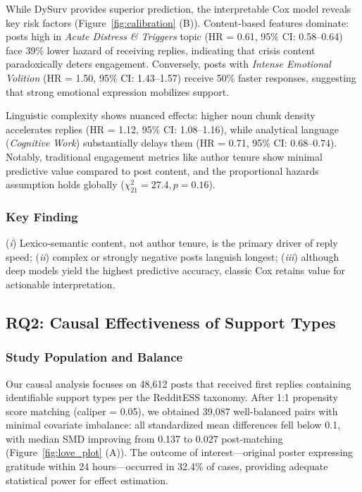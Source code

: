 \documentclass[letterpaper]{article} %
\begin{document}
While DySurv provides superior prediction, the interpretable Cox model reveals key risk factors (Figure~\ref{fig:calibration} (B)). Content-based features dominate: posts high in \emph{Acute Distress \& Triggers} topic (HR = 0.61, 95\% CI: 0.58–0.64) face 39\% lower hazard of receiving replies, indicating that crisis content paradoxically deters engagement. Conversely, posts with \emph{Intense Emotional Volition} (HR = 1.50, 95\% CI: 1.43–1.57) receive 50\% faster responses, suggesting that strong emotional expression mobilizes support.

Linguistic complexity shows nuanced effects: higher noun chunk density accelerates replies (HR = 1.12, 95\% CI: 1.08–1.16), while analytical language (\emph{Cognitive Work}) substantially delays them (HR = 0.71, 95\% CI: 0.68–0.74). Notably, traditional engagement metrics like author tenure show minimal predictive value compared to post content, and the proportional hazards assumption holds globally ($\chi^2_{21} = 27.4, p = 0.16$).

\subsubsection{Key Finding}(\emph{i}) Lexico‑semantic content, not author tenure, is the primary
driver of reply speed;
(\emph{ii}) complex or strongly negative posts languish longest;
(\emph{iii}) although deep models yield the highest predictive accuracy,
classic Cox retains value for actionable interpretation.

\subsection{RQ2: Causal Effectiveness of Support Types}

\subsubsection{Study Population and Balance}

Our causal analysis focuses on 48,612 posts that received first replies containing identifiable support types per the RedditESS taxonomy. After 1:1 propensity score matching (caliper = 0.05), we obtained 39,087 well-balanced pairs with minimal covariate imbalance: all standardized mean differences fell below 0.1, with median SMD improving from 0.137 to 0.027 post-matching (Figure~\ref{fig:love_plot} (A)). The outcome of interest—original poster expressing gratitude within 24 hours—occurred in 32.4\% of cases, providing adequate statistical power for effect estimation.
\end{document}
